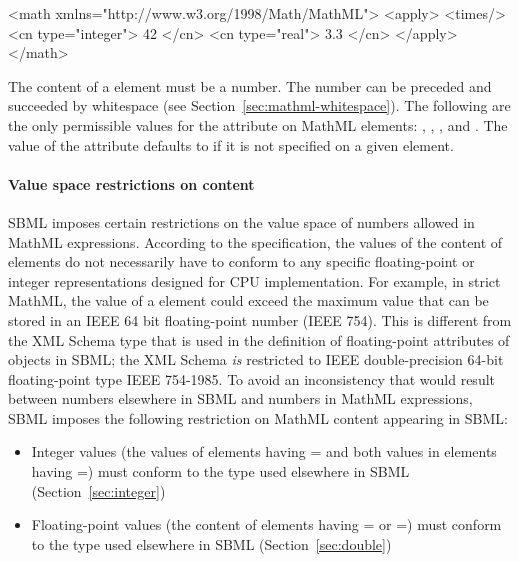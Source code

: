 \begin{example}
<math xmlns="http://www.w3.org/1998/Math/MathML">
    <apply>
        <times/> <cn type="integer"> 42 </cn> <cn type="real"> 3.3 </cn>
    </apply>
</math>
\end{example}

The content of a  element must be a number.  The number
can be preceded and succeeded by whitespace (see
Section~\ref{sec:mathml-whitespace}).  The following are the only
permissible values for the  attribute on MathML
 elements: , , ,
and .  The value of the  attribute
defaults to  if it is not specified on a given
 element.


\paragraph{Value space restrictions on  content}

SBML imposes certain restrictions on the value space of numbers
allowed in MathML expressions.  According to the \mathmltwo
specification, the values of the content of  elements do
not necessarily have to conform to any specific floating-point or
integer representations designed for CPU implementation.  For
example, in strict MathML, the value of a  element could
exceed the maximum value that can be stored in an IEEE 64 bit
floating-point number (IEEE 754).  This is different from the XML
Schema type  that is used in the definition of
floating-point attributes of objects in SBML; the XML Schema
 \emph{is} restricted to IEEE double-precision
64-bit floating-point type IEEE 754-1985.  To avoid an
inconsistency that would result between numbers elsewhere in SBML
and numbers in MathML expressions, SBML \thisLV imposes the
following restriction on MathML content appearing in SBML:
\begin{itemize}
  
\item Integer values (\ie the values of  elements
  having = and both values in  elements
  having =) must conform to the
   type used elsewhere in SBML
  (Section~\ref{sec:integer})
  
\item Floating-point values (\ie the content of 
  elements having = or
  =) must conform to the
   type used elsewhere in SBML
  (Section~\ref{sec:double})
\end{itemize}


